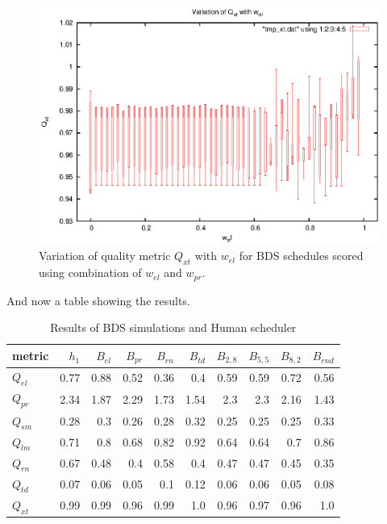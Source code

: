 \begin{figure}[htbp]
\begin{center}
    \includegraphics[scale=1.0, angle=0]{figures/mam/cmp_xt.eps}
    \caption[Variation of $Q_{xt}$ with $w_{el}$.]
      {Variation of quality metric $Q_{xt}$ with $w_{el}$ for BDS schedules scored using combination of $w_{el}$ and $w_{pr}$.}
\label{fig:mam_cmp_xt}
\end{center}
\end{figure}


And now a table showing the results.

\begin{table}
\begin{center}
\caption{Results of BDS simulations and Human scheduler}
\begin{tabular}{|l|rrrrrrrrr|}
\hline
{\bf metric} & {\bf $h_1$} & {\bf $B_{el}$} &  {\bf $B_{pr}$} & {\bf $B_{rn}$} & {\bf $B_{td}$} & {\bf $B_{2,8}$} & {\bf $B_{5,5}$} & {\bf $B_{8,2}$} & {\bf $B_{rnd}$}\\
\hline
{\bf $Q_{el}$} & 0.77 & 0.88 & 0.52 & 0.36 & 0.4  & 0.59 & 0.59 & 0.72 & 0.56 \\
{\bf $Q_{pr}$} & 2.34 & 1.87 & 2.29 & 1.73 & 1.54 & 2.3  & 2.3  & 2.16 & 1.43 \\
{\bf $Q_{sm}$} & 0.28 & 0.3  & 0.26 & 0.28 & 0.32 & 0.25 & 0.25 & 0.25 & 0.33 \\
{\bf $Q_{lm}$} & 0.71 & 0.8  & 0.68 & 0.82 & 0.92 & 0.64 & 0.64 & 0.7  & 0.86 \\
{\bf $Q_{rn}$} & 0.67 & 0.48 & 0.4  & 0.58 & 0.4  & 0.47 & 0.47 & 0.45 & 0.35 \\
{\bf $Q_{td}$} & 0.07 & 0.06 & 0.05 & 0.1  & 0.12 & 0.06 & 0.06 & 0.05 & 0.08 \\
{\bf $Q_{xt}$} & 0.99 & 0.99 & 0.96 & 0.99 & 1.0  & 0.96 & 0.97 & 0.96 & 1.0  \\
\hline
\end{tabular}
\end{center}
\end{table}


